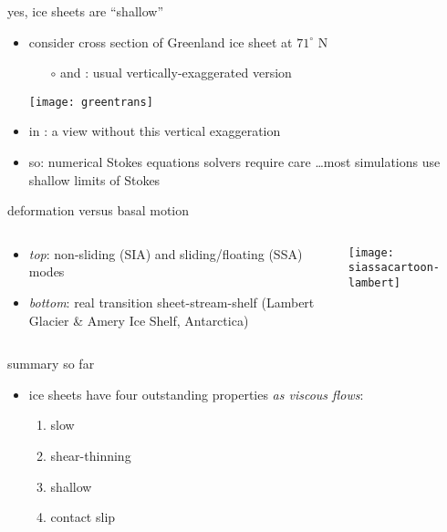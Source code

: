 \documentclass{beamer}
\begin{document}
\begin{frame}{yes, ice sheets are ``shallow''}

\begin{itemize}
\item consider cross section of Greenland ice sheet at $71^\circ$ N
\small
  \begin{itemize}
  \item[$\circ$] {\color{dark green}{green}} and {\color{dark blue}{blue}}: usual vertically-exaggerated version
  \end{itemize}
  \begin{center}
    \texttt{[image: greentrans]}
  \end{center}
\normalsize
\item in {\color{dark red}{red}}: a view without this vertical exaggeration
\item so: numerical Stokes equations solvers require care \dots most simulations use shallow limits of Stokes
\end{itemize}
\end{frame}


\begin{frame}{deformation versus basal motion}

\begin{columns}
\begin{column}{0.35\textwidth}
\small
\begin{itemize}
\item \emph{top}:  non-sliding (SIA) and sliding/floating (SSA) modes
\item \emph{bottom}:  real transition sheet-stream-shelf (Lambert Glacier \& Amery Ice Shelf, Antarctica)
\end{itemize}
\end{column}

\begin{column}{0.65\textwidth}
\texttt{[image: siassacartoon-lambert]}
\end{column}
\end{columns}
\end{frame}


\begin{frame}{summary so far}

\begin{itemize}
\item ice sheets have four outstanding properties \emph{as viscous flows}:
  \begin{enumerate}
  \item \alert{slow}
  \item \alert{shear-thinning}
  \item \alert{shallow}
  \item \alert{contact slip}
  \end{enumerate}
\end{itemize}
\end{frame}
\end{document}
